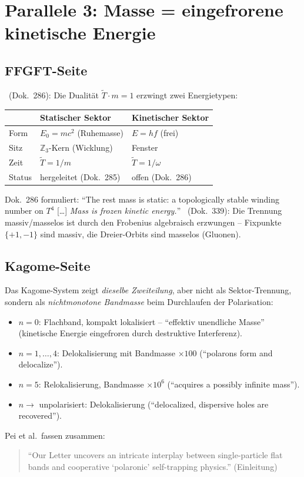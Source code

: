 \section{Parallele 3: Masse = eingefrorene kinetische Energie}

\subsection{FFGFT-Seite}

\BM\ (Dok.~286): Die Dualität $\tilde{T}\cdot m=1$ erzwingt zwei
Energietypen:
\begin{center}
\begin{tabular}{lll}
\toprule
 & Statischer Sektor & Kinetischer Sektor \\
\midrule
Form        & $E_0=mc^2$ (Ruhemasse)         & $E=hf$ (frei) \\
Sitz        & $\mathbb{Z}_3$-Kern (Wicklung) & Fenster \\
Zeit        & $\tilde{T}=1/m$                & $\tilde{T}=1/\omega$ \\
Status      & hergeleitet (Dok.~285)         & offen (Dok.~286) \\
\bottomrule
\end{tabular}
\end{center}
Dok.~286 formuliert: \enquote{The rest mass is static: a topologically stable
winding number on $T^4$ [\ldots] \emph{Mass is frozen kinetic energy.}}
\BM\ (Dok.~339): Die Trennung massiv/masselos ist durch den Frobenius
algebraisch erzwungen -- Fixpunkte $\{+1,-1\}$ sind massiv, die
Dreier-Orbits sind masselos (Gluonen).

\subsection{Kagome-Seite}

Das Kagome-System zeigt \emph{dieselbe Zweiteilung}, aber nicht als
Sektor-Trennung, sondern als \emph{nichtmonotone Bandmasse} beim Durchlaufen
der Polarisation:
\begin{itemize}
  \item $n=0$: Flachband, kompakt lokalisiert -- \enquote{effektiv unendliche
        Masse} (kinetische Energie eingefroren durch destruktive Interferenz).
  \item $n=1,\ldots,4$: Delokalisierung mit Bandmasse $\times100$
        (\enquote{polarons form and delocalize}).
  \item $n=5$: Relokalisierung, Bandmasse $\times10^6$ (\enquote{acquires a
        possibly infinite mass}).
  \item $n\to$ unpolarisiert: Delokalisierung (\enquote{delocalized, dispersive
        holes are recovered}).
\end{itemize}
Pei et al.\ fassen zusammen:
\begin{quote}\QM
\enquote{Our Letter uncovers an intricate interplay between single-particle
flat bands and cooperative \enquote{polaronic} self-trapping physics.}
(Einleitung)
\end{quote}

